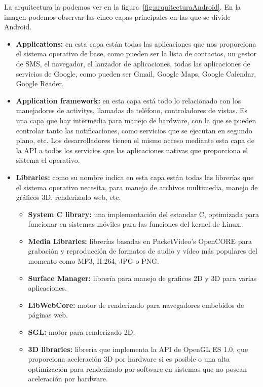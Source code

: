 La arquitectura la podemos ver en la figura~\ref{fig:arquitecturaAndroid}. En la imagen podemos observar las cinco capas principales en las que se divide Android.
\begin{itemize}

\item \textbf{Applications:} en esta capa están todas las aplicaciones que nos proporciona el sistema operativo de base, como pueden ser la lista de contactos, un gestor de SMS, el navegador, el lanzador de aplicaciones, todas las aplicaciones de servicios de Google, como pueden ser Gmail, Google Maps, Google Calendar, Google Reader.   

\item \textbf{Application framework:} en esta capa está todo lo relacionado con los manejadores de activitys, llamadas de teléfono, controladores de vistas. Es una capa que hay intermedia para manejo de hardware, con la que se pueden controlar tanto las notificaciones, como servicios que se ejecutan en segundo plano, etc. Los desarrolladores tienen el mismo acceso mediante esta capa de la API a todos los servicios que las aplicaciones nativas que proporciona el sistema el operativo. 

\item \textbf{Libraries:} como su nombre indica en esta capa están todas las librerías que el sistema operativo necesita, para manejo de archivos multimedia, manejo de gráficos 3D, renderizado web, etc.

\begin{itemize}
	\item \textbf{System C library:} una implementación del estandar C, optimizada para funcionar en sistemas móviles para las funciones del kernel de Linux.
	\item \textbf{Media Libraries:} librerías basadas en PacketVideo's OpenCORE para grabación y reproducción de formatos de audio y vídeo más populares del momento como MP3, H.264, JPG o PNG.

	\item \textbf{Surface Manager:} librería para manejo de graficos 2D y 3D para varias aplicaciones.

	\item \textbf{LibWebCore:} motor de renderizado para navegadores embebidos de páginas web.

	\item \textbf{SGL:} motor para renderizado 2D.

	\item \textbf{3D libraries:} librería que implementa la API de OpenGL ES 1.0, que proporciona aceleración 3D por hardware si es posible o una alta optimización para renderizado por software en sistemas que no posean aceleración por hardware.


\end{itemize}
\end{itemize}
